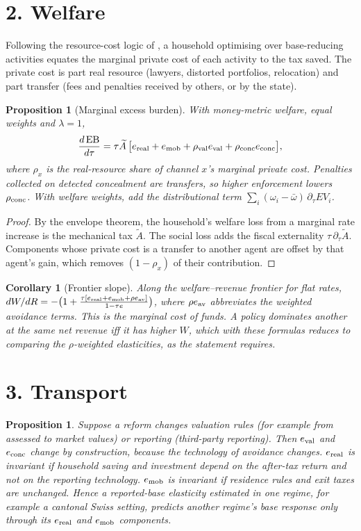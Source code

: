 \documentclass[11pt]{article}
\newtheorem{proposition}[theorem]{Proposition}
\newtheorem{corollary}[theorem]{Corollary}
\theoremstyle{definition}
\begin{document}
\section*{2. Welfare}
Following the resource-cost logic of \cite{chetty}, a household optimising over base-reducing activities equates the
marginal private cost of each activity to the tax saved. The private cost is part real resource (lawyers, distorted portfolios,
relocation) and part transfer (fees and penalties received by others, or by the state).
\begin{proposition}[Marginal excess burden]\label{prop:meb}
With money-metric welfare, equal weights and $\lambda=1$,
\[
 \frac{d\,\mathrm{EB}}{d\tau}=\tau\widetilde A\,\bigl[e_{\rm real}+e_{\rm mob}+\rho_{\rm val}e_{\rm val}+\rho_{\rm conc}e_{\rm conc}\bigr],
\]
where $\rho_x$ is the real-resource share of channel $x$'s marginal private cost. Penalties collected on detected
concealment are transfers, so higher enforcement lowers $\rho_{\rm conc}$. With welfare weights, add the distributional
term $\sum_i(\omega_i-\bar\omega)\,\partial_\tau EV_i$.
\end{proposition}
\begin{proof}
By the envelope theorem, the household's welfare loss from a marginal rate increase is the mechanical tax $\widetilde A$.
The social loss adds the fiscal externality $\tau\,\partial_\tau\widetilde A$. Components whose private cost is a transfer
to another agent are offset by that agent's gain, which removes $(1-\rho_x)$ of their contribution.
\end{proof}
\begin{corollary}[Frontier slope]
Along the welfare--revenue frontier for flat rates, $dW/dR=-\bigl(1+\frac{\tau[e_{\rm real}+e_{\rm mob}+\rho e_{\rm av}]}{1-\tau e}\bigr)$,
where $\rho e_{\rm av}$ abbreviates the weighted avoidance terms. This is the marginal cost of funds. A policy dominates
another at the same net revenue iff it has higher $W$, which with these formulas reduces to comparing the
$\rho$-weighted elasticities, as the statement requires.
\end{corollary}

\section*{3. Transport}
\begin{proposition}\label{prop:transport}
Suppose a reform changes valuation rules (for example from assessed to market values) or reporting (third-party reporting).
Then $e_{\rm val}$ and $e_{\rm conc}$ change by construction, because the technology of avoidance changes. $e_{\rm real}$ is
invariant if household saving and investment depend on the after-tax return and not on the reporting technology.
$e_{\rm mob}$ is invariant if residence rules and exit taxes are unchanged. Hence a reported-base elasticity estimated in
one regime, for example a cantonal Swiss setting, predicts another regime's base response only through its $e_{\rm real}$
and $e_{\rm mob}$ components.
\end{proposition}
\end{document}

